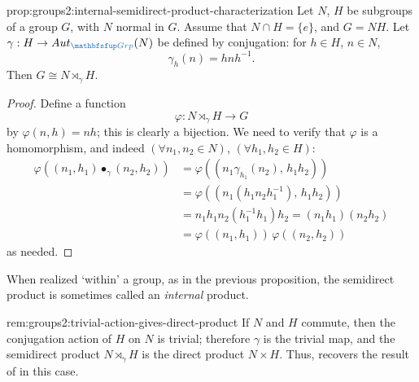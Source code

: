 \begin{prop}{}{prop:groups2:internal-semidirect-product-characterization}
  Let $N$, $H$ be subgroups of a group $G$, with $N$ normal in $G$.
  Assume that $N \cap H = \{e\}$, and $G = NH$. Let
  $\gamma : H \to \Aut_{\categ{Grp}}(N)$ be defined by conjugation:
  for $h \in H$, $n \in N$,
  \[\gamma_h(n) = hnh^{-1}.\]
  Then $G \cong N \rtimes_\gamma H$.
\end{prop}
\begin{proof}
  Define a function
  \[\varphi : N \rtimes_\gamma H \to G\]
  by $\varphi(n, h) = nh$; this is clearly a bijection. We need to
  verify that $\varphi$ is a homomorphism, and indeed
  $(\forall n_1, n_2 \in N)$, $(\forall h_1, h_2 \in H)$:
  \begin{align*}
    \varphi((n_1, h_1) \bullet_\gamma (n_2, h_2))
    &= \varphi((n_1 \gamma_{h_1}(n_2),\, h_1 h_2)) \\
    &= \varphi((n_1(h_1 n_2 h_1^{-1}),\, h_1 h_2)) \\
    &= n_1 h_1 n_2 (h_1^{-1} h_1) h_2 = (n_1 h_1)(n_2 h_2) \\
    &= \varphi((n_1, h_1))\,\varphi((n_2, h_2))
  \end{align*}
  as needed.
\end{proof}
When realized `within' a group, as in the previous proposition, the
semidirect product is sometimes called an \emph{internal} product.
\begin{rem}{}{rem:groups2:trivial-action-gives-direct-product}
  If $N$ and $H$ commute, then the conjugation action of $H$ on $N$ is
  trivial; therefore $\gamma$ is the trivial map, and the semidirect
  product $N \rtimes_\gamma H$ is the direct product $N \times H$.
  Thus,  recovers the result of
   in this case.
\end{rem}
